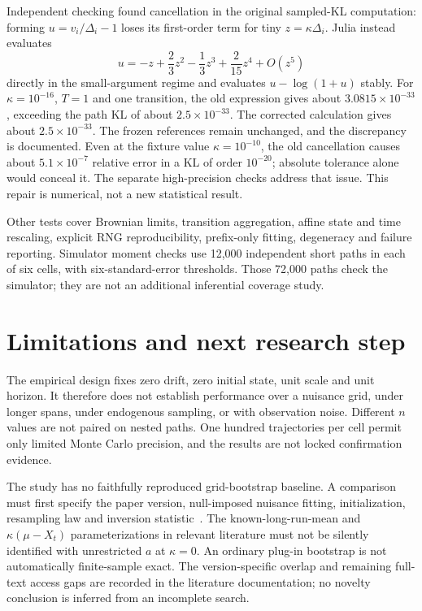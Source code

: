 \documentclass[11pt]{article}
\begin{document}
Independent checking found cancellation in the original sampled-KL computation:
forming $u=v_i/\Delta_i-1$ loses its first-order term for tiny
$z=\kappa\Delta_i$. Julia instead evaluates
\[
 u=-z+\frac23z^2-\frac13z^3+\frac{2}{15}z^4+O(z^5)
\]
directly in the small-argument regime and evaluates $u-\log(1+u)$ stably.
For $\kappa=10^{-16}$, $T=1$ and one transition, the old expression gives about
$3.0815\times10^{-33}$, exceeding the path KL of about $2.5\times10^{-33}$.
The corrected calculation gives about $2.5\times10^{-33}$. The frozen references
remain unchanged, and the discrepancy is documented. Even at the fixture value
$\kappa=10^{-10}$, the old cancellation causes about $5.1\times10^{-7}$ relative
error in a KL of order $10^{-20}$; absolute tolerance alone would conceal it.
The separate high-precision checks address that issue. This repair is numerical,
not a new statistical result.

Other tests cover Brownian limits, transition aggregation, affine state and time
rescaling, explicit RNG reproducibility, prefix-only fitting, degeneracy and
failure reporting. Simulator moment checks use 12,000 independent short paths
in each of six cells, with six-standard-error thresholds. Those 72,000 paths
check the simulator; they are not an additional inferential coverage study.

\section{Limitations and next research step}
The empirical design fixes zero drift, zero initial state, unit scale and unit
horizon. It therefore does not establish performance over a nuisance grid,
under longer spans, under endogenous sampling, or with observation noise.
Different $n$ values are not paired on nested paths. One hundred trajectories
per cell permit only limited Monte Carlo precision, and the results are not
locked confirmation evidence.

The study has no faithfully reproduced grid-bootstrap baseline. A comparison
must first specify the paper version, null-imposed nuisance fitting,
initialization, resampling law and inversion statistic~\cite{hansen,lui}.
The known-long-run-mean and $\kappa(\mu-X_t)$ parameterizations in relevant
literature must not be silently identified with unrestricted $a$ at
$\kappa=0$. An ordinary plug-in bootstrap is not automatically finite-sample
exact. The version-specific overlap and remaining full-text access gaps are
recorded in the literature documentation; no novelty conclusion is inferred
from an incomplete search.
\end{document}
